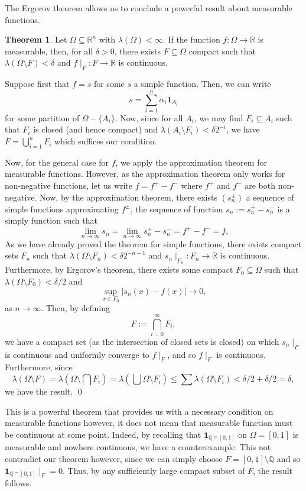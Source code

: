 \documentclass[
]{article}
\theoremstyle{definition}
\newtheorem{theorem}{Theorem}
\theoremstyle{definition}
\begin{document}
The Ergorov theorem allows us to conclude a powerful result about
measurable functions.

\begin{theorem}
  Let \(\Omega \subseteq \mathbb{R}^n\) with \(\lambda(\Omega) < \infty\).  
  If the function \(f : \Omega \to \mathbb{R}\) is measurable, then, for all 
  \(\delta > 0\), there exists \(F \subseteq \Omega\) compact such that 
  \(\lambda(\Omega \setminus F) < \delta\) and \(f\mid_F : F \to \mathbb{R}\) 
  is continuous.
\end{theorem}
\proof

Suppose first that \(f = s\) for some \(s\) a simple function. Then, we
can write \[s = \sum_{i = 1}^n \alpha_i \mathbf{1}_{A_i}\] for some
partition of \(\Omega\) -- \(\{A_i\}\). Now, since for all \(A_i\), we
may find \(F_i \subseteq A_i\) such that \(F_i\) is closed (and hence
compact) and \(\lambda(A_i \setminus F_i) < \delta 2^{-i}\), we have
\(F = \bigcup_{i = 1}^n F_i\) which suffices our condition.

Now, for the general case for \(f\), we apply the approximation theorem
for measurable functions. However, as the approximation theorem only
works for non-negative functions, let us write \(f = f^+ - f^-\) where
\(f^+\) and \(f^-\) are both non-negative. Now, by the approximation
theorem, there exists \((s_n^\pm)\) a sequence of simple functions
approximating \(f^\pm\), the sequence of function
\(s_n := s_n^+ - s_n^-\) is a simply function such that
\[\lim_{n \to \infty} s_n = \lim_{n \to \infty} s_n^+ - s_n^- = f^+ - f^- = f.\]
As we have already proved the theorem for simple functions, there exists
compact sets \(F_n\) such that
\(\lambda(\Omega \setminus F_n) < \delta 2^{-n - 1}\) and
\(s_n\mid_{F_n} : F_n \to \mathbb{R}\) is continuous. Furthermore, by
Ergorov's theorem, there exists some compact \(F_0 \subseteq \Omega\)
such that \(\lambda(\Omega \setminus F_0) < \delta / 2\) and
\[\sup_{x \in F_0} |s_n(x) - f(x)| \to 0,\] as \(n \to \infty\). Then,
by defining \[F := \bigcap_{i = 0}^\infty F_i,\] we have a compact set
(as the intersection of closed sets is closed) on which \(s_n \mid_F\)
is continuous and uniformly converge to \(f\mid_F\), and so \(f\mid_F\)
is continuous. Furthermore, since
\[\lambda(\Omega \setminus F) = \lambda\left(\Omega \setminus \bigcap F_i\right)
    = \lambda\left(\bigcup \Omega \setminus F_i\right) 
    \le \sum \lambda(\Omega \setminus F_i) < \delta / 2 + \delta / 2 = \delta,\]
we have the result. \qed

This is a powerful theorem that provides us with a necessary condition
on measurable functions however, it does not mean that measurable
function must be continuous at some point. Indeed, by recalling that
\(\mathbf{1}_{\mathbb{Q} \cap [0, 1]}\) on \(\Omega = [0, 1]\) is
measurable and nowhere continuous, we have a counterexample. This not
contradict our theorem however, since we can simply choose
\(F = [0, 1] \setminus \mathbb{Q}\) and so
\(\mathbf{1}_{\mathbb{Q} \cap [0, 1]} \mid_F = 0\). Thus, by any
sufficiently large compact subset of \(F\), the result follows.
\end{document}
